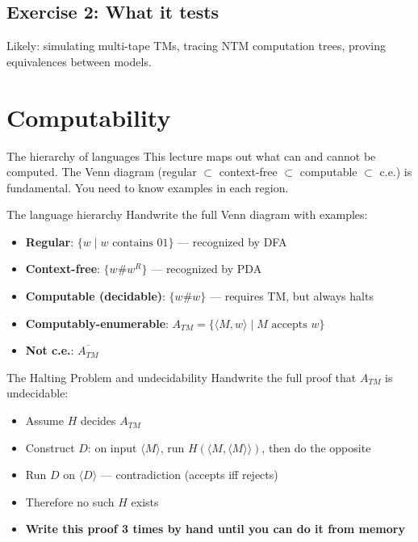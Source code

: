 \documentclass[11pt,a4paper]{article}
\begin{document}
\subsection*{Exercise 2: What it tests}
Likely: simulating multi-tape TMs, tracing NTM computation trees, proving equivalences between models.

\section{Computability}

\begin{whybox}{The hierarchy of languages}
This lecture maps out what can and cannot be computed. The Venn diagram (regular $\subset$ context-free $\subset$ computable $\subset$ c.e.) is fundamental. You need to know examples in each region.
\end{whybox}

\begin{writebox}{The language hierarchy}
Handwrite the full Venn diagram with examples:
\begin{itemize}[nosep]
\item \textbf{Regular}: $\{w \mid w \text{ contains } 01\}$ --- recognized by DFA
\item \textbf{Context-free}: $\{w\#w^R\}$ --- recognized by PDA
\item \textbf{Computable (decidable)}: $\{w\#w\}$ --- requires TM, but always halts
\item \textbf{Computably-enumerable}: $A_{TM} = \{\langle M,w \rangle \mid M \text{ accepts } w\}$
\item \textbf{Not c.e.}: $\overline{A_{TM}}$
\end{itemize}
\end{writebox}

\begin{writebox}{The Halting Problem and undecidability}
Handwrite the full proof that $A_{TM}$ is undecidable:
\begin{itemize}[nosep]
\item Assume $H$ decides $A_{TM}$
\item Construct $D$: on input $\langle M \rangle$, run $H(\langle M, \langle M \rangle \rangle)$, then do the opposite
\item Run $D$ on $\langle D \rangle$ --- contradiction (accepts iff rejects)
\item Therefore no such $H$ exists
\item \textbf{Write this proof 3 times by hand until you can do it from memory}
\end{itemize}
\end{writebox}
\end{document}
